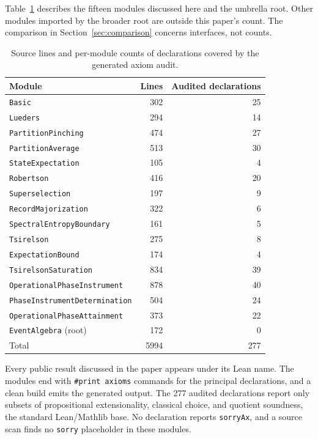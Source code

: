 \documentclass[11pt]{article}
\renewcommand{\_}{\textunderscore\allowbreak}
\theoremstyle{remark}
\begin{document}
Table~\ref{tab:scale} describes the fifteen modules discussed here and the
umbrella root. Other modules imported by the broader root are outside this
paper's count. The comparison in Section~\ref{sec:comparison} concerns
interfaces, not counts.

\begin{table}[ht]
\centering
\small
\begin{tabular}{@{}lrr@{}}
\toprule
Module & Lines & Audited declarations \\
\midrule
\texttt{Basic} & 302 & 25 \\
\texttt{Lueders} & 294 & 14 \\
\texttt{PartitionPinching} & 474 & 27 \\
\texttt{PartitionAverage} & 513 & 30 \\
\texttt{StateExpectation} & 105 & 4 \\
\texttt{Robertson} & 416 & 20 \\
\texttt{Superselection} & 197 & 9 \\
\texttt{RecordMajorization} & 322 & 6 \\
\texttt{SpectralEntropyBoundary} & 161 & 5 \\
\texttt{Tsirelson} & 275 & 8 \\
\texttt{ExpectationBound} & 174 & 4 \\
\texttt{TsirelsonSaturation} & 834 & 39 \\
\texttt{OperationalPhaseInstrument} & 878 & 40 \\
\texttt{PhaseInstrumentDetermination} & 504 & 24 \\
\texttt{OperationalPhaseAttainment} & 373 & 22 \\
\texttt{EventAlgebra} (root) & 172 & 0 \\
\midrule
Total & 5994 & 277 \\
\bottomrule
\end{tabular}
\caption{Source lines and per-module counts of declarations covered by the
generated axiom audit.}
\label{tab:scale}
\end{table}

Every public result discussed in the paper appears under its Lean name. The
modules end with \texttt{\#print axioms} commands for the principal
declarations, and a clean build emits the generated output. The 277 audited
declarations report only subsets of propositional extensionality, classical
choice, and quotient soundness, the standard Lean/Mathlib base. No declaration
reports \texttt{sorryAx}, and a source scan finds no \texttt{sorry}
placeholder in these modules.
\end{document}
